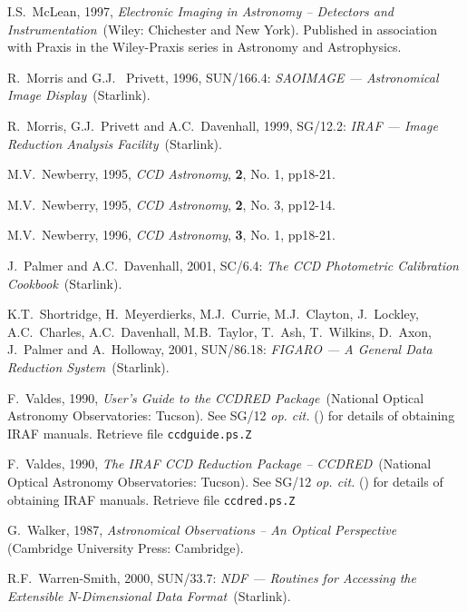 \documentclass[twoside,11pt]{article}
\newcommand{\xref}[3]{#1}
\begin{document}
\begin{thebibliography}{99}
   I.S.~McLean, 1997, {\it Electronic Imaging in
   Astronomy -- Detectors and Instrumentation}\, (Wiley: Chichester and
   New York).  Published in association with Praxis in the Wiley-Praxis
   series in Astronomy and Astrophysics.

   R.~Morris and G.J.~ Privett, 1996,
   \xref{SUN/166.4}{sun166}{}: {\it SAOIMAGE --- Astronomical Image
   Display}\, (Starlink).

   R.~Morris, G.J.~Privett and A.C.~Davenhall, 1999,
   \xref{SG/12.2}{sg12}{}: {\it IRAF --- Image Reduction Analysis Facility}\,
   (Starlink).

   M.V.~Newberry, 1995, {\it CCD Astronomy},
   {\bf 2}, No. 1, pp18-21.

   M.V.~Newberry, 1995, {\it CCD Astronomy},
   {\bf 2}, No. 3, pp12-14.

   M.V.~Newberry, 1996, {\it CCD Astronomy},
   {\bf 3}, No. 1, pp18-21.

   J.~Palmer and A.C.~Davenhall, 2001, \xref{SC/6.4}{sc6}{}:
   {\it The CCD Photometric Calibration Cookbook}\, (Starlink).

   K.T.~Shortridge, H.~Meyerdierks, M.J.~Currie,
   M.J.~Clayton, J.~Lockley, A.C.~Charles, A.C.~Davenhall, M.B.~Taylor,
   T.~Ash, T.~Wilkins, D.~Axon, J.~Palmer and A.~Holloway,
   2001, \xref{SUN/86.18}{sun86}{}: {\it FIGARO --- A General Data
   Reduction System}\, (Starlink).

   F.~Valdes, 1990, {\it User's Guide to the CCDRED
   Package}\, (National Optical Astronomy Observatories: Tucson).  See
   \xref{SG/12}{sg12}{} {\it op. cit.}\/ (\cite{SG12}) for details of
   obtaining IRAF manuals.  Retrieve file {\tt ccdguide.ps.Z}

   F.~Valdes, 1990, {\it The IRAF CCD Reduction
   Package -- CCDRED}\, (National Optical Astronomy Observatories: Tucson).
   See \xref{SG/12}{sg12}{} {\it op. cit.}\/ (\cite{SG12}) for details of
   obtaining IRAF manuals.  Retrieve file {\tt ccdred.ps.Z}

   G.~Walker, 1987, {\it Astronomical Observations
   -- An Optical Perspective}\, (Cambridge University Press: Cambridge).

   R.F.~Warren-Smith, 2000, \xref{SUN/33.7}{sun33}{}: {\it
   NDF --- Routines for Accessing the Extensible N-Dimensional Data
   Format}\, (Starlink).


\end{thebibliography}
\end{document}
